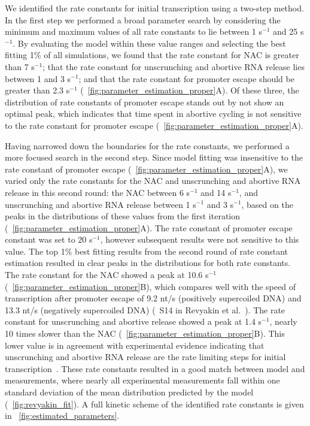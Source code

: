 %

We identified the rate constants for initial transcription using a two-step
method. In the first step we performed a broad parameter search by considering
the minimum and maximum values of all rate constants to lie between 1 s$^{-1}$
and 25 s$^{-1}$. By evaluating the model within these value ranges and
selecting the best fitting 1\% of all simulations, we found that the rate
constant for NAC is greater than 7 s$^{-1}$; that the rate constant for
unscrunching and abortive RNA release lies between 1 and 3 s$^{-1}$; and that
the rate constant for promoter escape should be greater than 2.3 s$^{-1}$
(\FIG~\ref{fig:parameter_estimation_proper}A). Of these three, the
distribution of rate constants of promoter escape stands out by not show an
optimal peak, which indicates that time spent in abortive cycling is not
sensitive to the rate constant for promoter escape
(\FIG~\ref{fig:parameter_estimation_proper}A).

Having narrowed down the boundaries for the rate constants, we performed a
more focused search in the second step. Since model fitting was insensitive to
the rate constant of promoter escape
(\FIG~\ref{fig:parameter_estimation_proper}A), we varied only the rate
constants for the NAC and unscrunching and abortive RNA release in this second
round: the NAC between 6 s$^{-1}$ and 14 s$^{-1}$, and unscrunching and
abortive RNA release between 1 s$^{-1}$ and 3 s$^{-1}$, based on the peaks in
the distributions of these values from the first iteration
(\FIG~\ref{fig:parameter_estimation_proper}A). The rate constant of promoter
escape constant was set to 20 s$^{-1}$, however subsequent results were not
sensitive to this value. The top 1\% best fitting results from the second
round of rate constant estimation resulted in clear peaks in the distributions
for both rate constants. The rate constant for the NAC showed a peak at 10.6
s$^{-1}$ (\FIG~\ref{fig:parameter_estimation_proper}B), which compares well
with the speed of transcription after promoter escape of 9.2 nt/s (positively
supercoiled DNA) and 13.3 nt/s (negatively supercoiled DNA) (\FIG~S14 in
Revyakin et al.\ \cite{revyakin_abortive_2006}). The rate constant for
unscrunching and abortive release showed a peak at 1.4 s$^{-1}$, nearly 10
times slower than the NAC (\FIG~\ref{fig:parameter_estimation_proper}B). This
lower value is in agreement with experimental evidence indicating that
unscrunching and abortive RNA release are the rate limiting steps for initial
transcription~\cite{revyakin_abortive_2006, margeat_direct_2006}. These rate
constants resulted in a good match between model and measurements, where
nearly all experimental measurements fall within one standard deviation of the
mean distribution predicted by the model (\FIG~\ref{fig:revyakin_fit}). A full
kinetic scheme of the identified rate constants is given in
\FIG~\ref{fig:estimated_parameters}.

